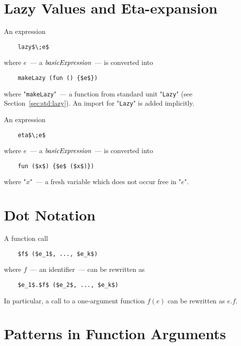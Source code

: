 \section{Lazy Values and Eta-expansion}

An expression

\begin{lstlisting}
    lazy$\;e$
\end{lstlisting}

where $e$~--- a $\textit{basicExpression}$~--- is converted into

\begin{lstlisting}
    makeLazy (fun () {$e$})    
\end{lstlisting}

where "\lstinline|makeLazy|"~--- a function from standard unit "\lstinline|Lazy|" (see Section~\ref{sec:std:lazy}). An import for
"\lstinline|Lazy|" is added implicitly.

An expression

\begin{lstlisting}
    eta$\;e$
\end{lstlisting}

where $e$~--- a $\textit{basicExpression}$~--- is converted into

\begin{lstlisting}
    fun ($x$) {$e$ ($x$)})    
\end{lstlisting}

where "$x$"~--- a fresh variable which does not occur free in "$e$".

\section{Dot Notation}
\label{sec:dot-notation}

A function call

\begin{lstlisting}
    $f$ ($e_1$, ..., $e_k$)
\end{lstlisting}

where $f$~--- an identifier~--- can be rewritten as

\begin{lstlisting}
    $e_1$.$f$ ($e_2$, ..., $e_k$)
\end{lstlisting}

In particular, a call to a one-argument function $f (e)$ can be rewritten as $e.f$.

\section{Patterns in Function Arguments}

